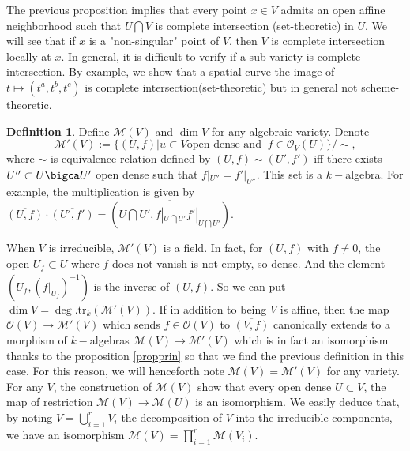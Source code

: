\documentclass[12pt,a4paper,english]{article}
\theoremstyle{plain}
\theoremstyle{definition}
\newtheorem{defi}{Definition}
\theoremstyle{remark}
\newcommand{\tr}{\mathrm{tr}}
\begin{document}
The previous proposition implies that every point $x\in V$ admits an open affine neighborhood such that $U\bigcap V$ is complete intersection (set-theoretic) in $U$. We will see that if $x$ is a "non-singular" point of $V$, then $V$ is complete intersection locally at $x$. In general, it is difficult to verify if a sub-variety is complete intersection. By example, we show that a spatial curve the image of  $t\mapsto(t^{a},t^{b},t^{c})$ is complete intersection(set-theoretic) but in general not scheme-theoretic. 
\begin{defi}
Define $\mathcal{M}(V)$ and $\dim V$ for any algebraic variety. Denote
\begin{equation*}
    \mathcal{M}'(V):=\{(U,f)|u\subset V \text{open dense and }\ f\in\mathcal{O}_{V}(U)\}/\sim,
\end{equation*}
where $\sim$ is equivalence relation defined by $(U,f)\sim(U',f')$ iff there exists $U''\subset U\bigca U'$ open dense such that $f|_{U''}=f'|_{U''}$. This set is a $k-$algebra. For example, the multiplication is given by $\overline{(U,f)}\cdot\overline{(U',f')}=\overline{(U\bigcap U', f|_{U\bigcap U'}f'|_{U\bigcap U'})}$.
\end{defi}
When $V$ is irreducible, $\mathcal{M}'(V)$ is a field. In fact, for $(U,f)$ with $f\not=0$, the open $U_{f}\subset U$ where $f$ does not vanish is not empty, so dense. And the element $\overline{(U_{f},(f|_{U_{f}})^{-1})}$ is the inverse of $\overline{(U,f)}$. So we can put $\dim V=\deg.\tr_{k}(\mathcal{M}'(V))$. If in addition to being $V$ is affine, then the map $\mathcal{O}(V)\rightarrow \mathcal{M}'(V)$ which sends $f\in\mathcal{O}(V)$ to $\overline{(V,f)}$ canonically extends to a morphism of $k-$algebras $\mathcal{M}(V)\rightarrow\mathcal{M}'(V)$ which is in fact an isomorphism thanks to the proposition \ref{propprin} so that we find the previous definition in this case. For this reason, we will henceforth note $\mathcal{M}(V)=\mathcal{M}'(V)$ for any variety.          
For any $V$, the construction of $\mathcal{M}(V)$ show that every open dense $U\subset V$, the map of restriction $\mathcal{M}(V)\rightarrow\mathcal{M}(U)$ is an isomorphism. We easily deduce that, by noting $V=\bigcup^{r}_{i=1}V_{i}$ the decomposition of $V$ into the irreducible components, we have an isomorphism $\mathcal{M}(V)=\prod^{r}_{i=1}\mathcal{M}(V_{i})$.
\end{document}
